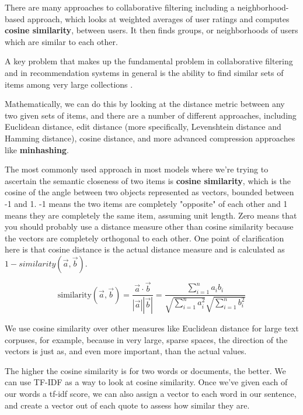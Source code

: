 \documentclass[11pt, table]{diazessay} %
\begin{document}
\begin{sloppypar}
There are many approaches to collaborative filtering including a neighborhood-based approach,  which looks at weighted averages of user ratings and computes \textbf{cosine similarity}, between users.  It then finds groups, or neighborhoods of users which are similar to each other.

A key problem that makes up the fundamental problem in collaborative filtering and in recommendation systems in general is the ability to find similar sets of items among very large collections \citep{leskovec2020mining}.

Mathematically, we can do this by looking at the distance metric between any two given sets of items, and there are a number of different approaches, including  Euclidean distance, edit distance (more specifically, Levenshtein distance and Hamming distance), cosine distance, and more advanced compression approaches like \textbf{minhashing}.

The most commonly used approach in most models where we're trying to ascertain the semantic closeness of two items is \textbf{cosine similarity}, which is the cosine of the angle between two objects represented as vectors, bounded between -1 and 1. -1 means the two items are completely "opposite" of each other and 1 means they are completely the same item, assuming unit length. Zero means that you should probably use a distance measure other than cosine similarity because the vectors are completely orthogonal to each other. One point of clarification here is that cosine distance is the actual distance measure and is calculated as $1 - {similarity}(\vec{a}, \vec{b})$.

\begin{equation}
\mathrm{similarity}(\vec{a}, \vec{b}) = \frac{\vec{a} \cdot \vec{b}}{|\vec{a}| |\vec{b}|} = \frac{\sum\limits_{i=1}^{n} a_i b_i}{\sqrt{\sum\limits_{i=1}^{n} a_i^2} \sqrt{\sum\limits_{i=1}^{n} b_i^2}}
\end{equation}

We use cosine similarity over other measures like Euclidean distance for large text corpuses, for example, because in very large, sparse spaces, the direction of the vectors is just as, and even more important, than the actual values.

The higher the cosine similarity is for two words or documents, the better. We can use TF-IDF as a  way to look at cosine similarity. Once we've given each of our words a tf-idf score, we can also assign a vector to each word in our sentence, and create a vector out of each quote to assess how similar they are.



\end{sloppypar}
\end{document}
